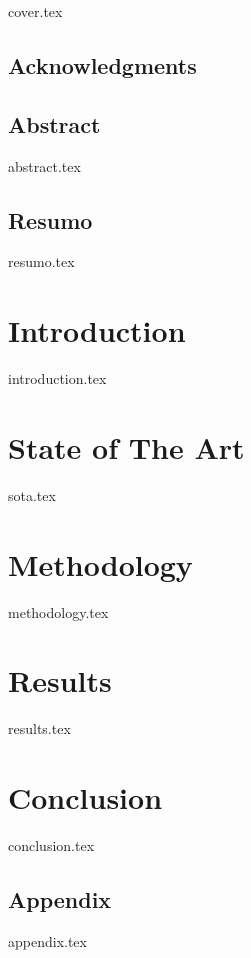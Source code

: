 \documentclass[a4paper, 12pt]{report}
\begin{document}
{cover.tex}
\newpage
\printglossary[type=\acronymtype, nonumberlist]

\newpage
\listoffigures

\newpage
\listoftables

\newpage
\tableofcontents
\frontmatter
\section*{Acknowledgments}

\newpage
\section*{Abstract}
{abstract.tex}

\newpage
\section*{Resumo}
{resumo.tex}

\mainmatter


\newpage
\chapter{Introduction}
{introduction.tex}

\newpage
\chapter{State of The Art}
{sota.tex}

\newpage
\chapter{Methodology}
{methodology.tex}

\newpage
\chapter{Results}
{results.tex}

\newpage
\chapter{Conclusion}
{conclusion.tex}

\newpage
\printbibliography

\newpage
\section*{Appendix}
{appendix.tex}
\end{document}
